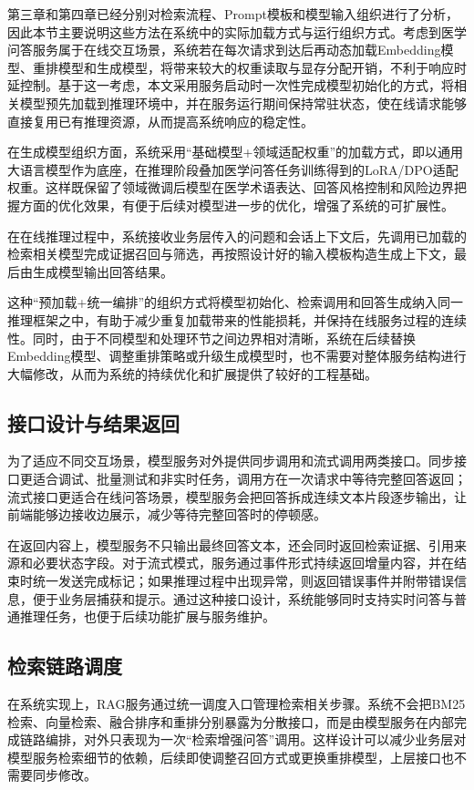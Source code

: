 第三章和第四章已经分别对检索流程、Prompt模板和模型输入组织进行了分析，因此本节主要说明这些方法在系统中的实际加载方式与运行组织方式。考虑到医学问答服务属于在线交互场景，系统若在每次请求到达后再动态加载Embedding模型、重排模型和生成模型，将带来较大的权重读取与显存分配开销，不利于响应时延控制。基于这一考虑，本文采用服务启动时一次性完成模型初始化的方式，将相关模型预先加载到推理环境中，并在服务运行期间保持常驻状态，使在线请求能够直接复用已有推理资源，从而提高系统响应的稳定性。

在生成模型组织方面，系统采用“基础模型+领域适配权重”的加载方式，即以通用大语言模型作为底座，在推理阶段叠加医学问答任务训练得到的LoRA/DPO适配权重。这样既保留了领域微调后模型在医学术语表达、回答风格控制和风险边界把握方面的优化效果，有便于后续对模型进一步的优化，增强了系统的可扩展性。

在在线推理过程中，系统接收业务层传入的问题和会话上下文后，先调用已加载的检索相关模型完成证据召回与筛选，再按照设计好的输入模板构造生成上下文，最后由生成模型输出回答结果。

这种“预加载+统一编排”的组织方式将模型初始化、检索调用和回答生成纳入同一推理框架之中，有助于减少重复加载带来的性能损耗，并保持在线服务过程的连续性。同时，由于不同模型和处理环节之间边界相对清晰，系统在后续替换Embedding模型、调整重排策略或升级生成模型时，也不需要对整体服务结构进行大幅修改，从而为系统的持续优化和扩展提供了较好的工程基础。

\subsection{接口设计与结果返回}

为了适应不同交互场景，模型服务对外提供同步调用和流式调用两类接口。同步接口更适合调试、批量测试和非实时任务，调用方在一次请求中等待完整回答返回；流式接口更适合在线问答场景，模型服务会把回答拆成连续文本片段逐步输出，让前端能够边接收边展示，减少等待完整回答时的停顿感。

在返回内容上，模型服务不只输出最终回答文本，还会同时返回检索证据、引用来源和必要状态字段。对于流式模式，服务通过事件形式持续返回增量内容，并在结束时统一发送完成标记；如果推理过程中出现异常，则返回错误事件并附带错误信息，便于业务层捕获和提示。通过这种接口设计，系统能够同时支持实时问答与普通推理任务，也便于后续功能扩展与服务维护。

\subsection{检索链路调度}

在系统实现上，RAG服务通过统一调度入口管理检索相关步骤。系统不会把BM25检索、向量检索、融合排序和重排分别暴露为分散接口，而是由模型服务在内部完成链路编排，对外只表现为一次“检索增强问答”调用。这样设计可以减少业务层对模型服务检索细节的依赖，后续即使调整召回方式或更换重排模型，上层接口也不需要同步修改。


